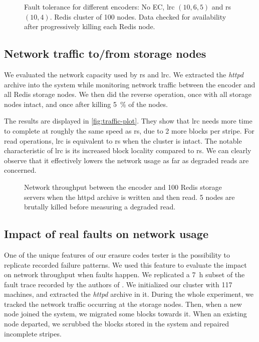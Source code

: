 \begin{figure}[t]
    \centering
    
    \caption{Fault tolerance for different encoders: No EC, \ac{lrc} $\left(10,6,5\right)$ and \ac{rs} $\left(10,4\right)$. Redis cluster of 100 nodes. Data checked for availability after progressively killing each Redis node.}
    \label{fig:checksum-plot}
\end{figure}


\subsection{Network traffic to/from storage nodes}
\label{subsec:network-traffic}

We evaluated the network capacity used by \ac{rs} and \ac{lrc}.
We extracted the \textit{httpd} archive into the system while monitoring network traffic between the encoder and all Redis storage nodes.
We then did the reverse operation, once with all storage nodes intact, and once after killing \SI{5}{\percent} of the nodes.

The results are displayed in \autoref{fig:traffic-plot}.
They show that \ac{lrc} needs more time to complete at roughly the same speed as \ac{rs}, due to 2 more blocks per stripe.
For read operations, \ac{lrc} is equivalent to \ac{rs} when the cluster is intact.
The notable characteristic of \ac{lrc} is its increased block locality compared to \ac{rs}.
We can clearly observe that it effectively lowers the network usage as far as degraded reads are concerned.
\begin{figure*}
    \centering
    
    \caption{Network throughput between the encoder and 100 Redis storage servers when the httpd archive is written and then read. 5 nodes are brutally killed before measuring a degraded read.}
    \label{fig:traffic-plot}
\end{figure*}



\subsection{Impact of real faults on network usage}
\label{subsec:fault-trace}

One of the unique features of our erasure codes tester is the possibility to replicate recorded failure patterns.
We used this feature to evaluate the impact on network throughput when faults happen.
We replicated a \SI{7}{\hour} subset of the fault trace recorded by the authors of \autocite{websites02}.
We initialized our cluster with 117 machines, and extracted the \textit{httpd} archive in it.
During the whole experiment, we tracked the network traffic occurring at the storage nodes.
Then, when a new node joined the system, we migrated some blocks towards it.
When an existing node departed, we scrubbed the blocks stored in the system and repaired incomplete stripes.

